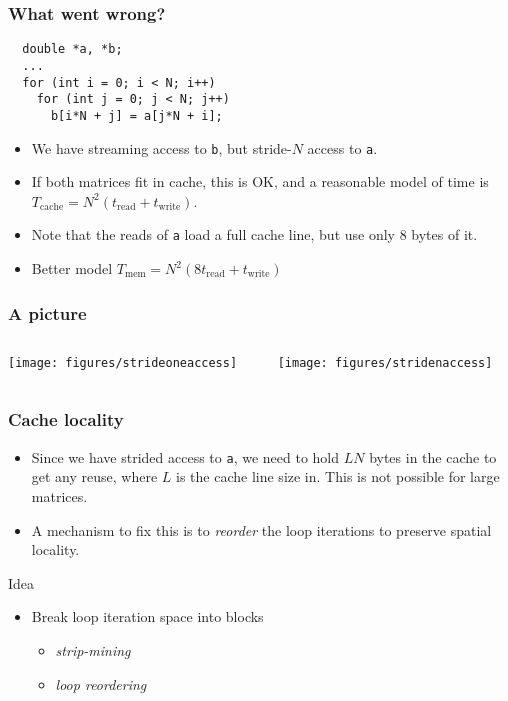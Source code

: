 \documentclass[presentation,aspectratio=43,10pt]{beamer}
\begin{document}
\begin{frame}[fragile]
  \frametitle{What went wrong?}
  \begin{center}
\begin{verbatim}
  double *a, *b;
  ...
  for (int i = 0; i < N; i++)
    for (int j = 0; j < N; j++)
      b[i*N + j] = a[j*N + i];
\end{verbatim}
  \end{center}
  \begin{itemize}
  \item We have streaming access to \texttt{b}, but stride-$N$ access
    to \texttt{a}.
  \item If both matrices fit in cache, this is OK, and a reasonable
    model of time is $T_{\text{cache}} = N^2(t_\text{read} +
    t_\text{write})$.
  \item Note that the reads of \texttt{a} load a full cache line, but use only 8 bytes
    of it.
  \item Better model $T_\text{mem} = N^2(8 t_\text{read} + t_\text{write})$
  \end{itemize}
\end{frame}

\begin{frame}
  \frametitle{A picture}
  \begin{columns}
    \begin{column}{0.45\textwidth}
      \begin{center}
        \texttt{[image: figures/strideoneaccess]}
      \end{center}
    \end{column}
    \begin{column}{0.45\textwidth}
      \begin{center}
        \texttt{[image: figures/stridenaccess]}
      \end{center}
    \end{column}
  \end{columns}
\end{frame}
\begin{frame}
  \frametitle{Cache locality}
  \begin{itemize}
  \item Since we have strided access to \texttt{a}, we need to hold
    $L N$ bytes in the cache to get any reuse, where $L$ is the cache
    line size in. This is not possible for large matrices.
  \item A mechanism to fix this is to \emph{reorder} the loop
    iterations to preserve spatial locality.
  \end{itemize}
  \begin{block}{Idea}
    \begin{itemize}
    \item Break loop iteration space into blocks
      \begin{itemize}
      \item \emph{strip-mining}
      \item \emph{loop reordering}
      \end{itemize}
    \end{itemize}
  \end{block}
\end{frame}
\end{document}
